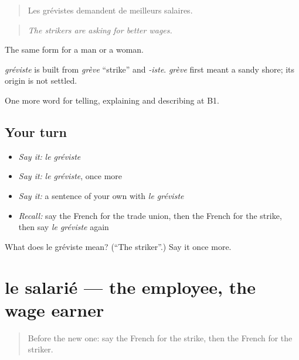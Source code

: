 \begin{quote}
Les grévistes demandent de meilleurs salaires.
\end{quote}

\begin{quote}
\emph{The strikers are asking for better wages.}
\end{quote}

The same form for a man or a woman.

\begin{cousinweb}
\emph{gréviste} is built from \emph{grève} \textquotedblleft{}strike\textquotedblright{} and \emph{-iste}. \emph{grève} first meant a sandy shore; its origin is not settled.
\end{cousinweb}

\begin{grammarlens}[title={What you've built}]
One more word for telling, explaining and describing at B1.
\end{grammarlens}

\subsection*{Your turn}
\begin{itemize}
\raggedright
  \item \emph{Say it:} \emph{le gréviste}
  \item \emph{Say it:} \emph{le gréviste}, once more
  \item \emph{Say it:} a sentence of your own with \emph{le gréviste}
  \item \emph{Recall:} say the French for the trade union, then the French for the strike, then say \emph{le gréviste} again
\end{itemize}

\begin{tcolorbox}[breakable,colback=teal!4,colframe=teal!35!black,title={Before you move on}]
What does le gréviste mean? (\textquotedblleft{}The striker\textquotedblright{}.) Say it once more.
\end{tcolorbox}
\section[le salarié]{le salarié — the employee, the wage earner}

\label{lesson:FR-C358-salarie}



\begin{quote}
Before the new one: say the French for the strike, then the French for the striker.
\end{quote}

